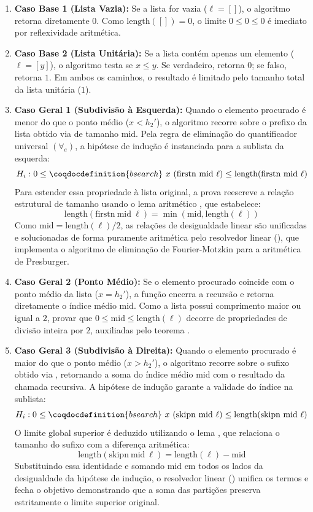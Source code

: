 \documentclass{article}
\begin{document}
\begin{enumerate}[leftmargin=*]
\item \textbf{Caso Base 1 (Lista Vazia):} Se a lista for vazia ($\ell = []$), o algoritmo retorna diretamente $0$. Como $\text{length}([]) = 0$, o limite $0 \le 0 \le 0$ é imediato por reflexividade aritmética.
\item \textbf{Caso Base 2 (Lista Unitária):} Se a lista contém apenas um elemento ($\ell = [y]$), o algoritmo testa se $x \le y$. Se verdadeiro, retorna $0$; se falso, retorna $1$. Em ambos os caminhos, o resultado é limitado pelo tamanho total da lista unitária ($1$).
\item \textbf{Caso Geral 1 (Subdivisão à Esquerda):} Quando o elemento procurado é menor do que o ponto médio ($x < h_2'$), o algoritmo recorre sobre o prefixo da lista obtido via  de tamanho $\text{mid}$. Pela regra de eliminação do quantificador universal $(\forall_e)$, a hipótese de indução é instanciada para a sublista da esquerda:
$$H_i: 0 \le \coqdocdefinition{bsearch} \ x \ (\text{firstn} \ \text{mid} \ \ell) \le \text{length}(\text{firstn} \ \text{mid} \ \ell)$$
Para estender essa propriedade à lista original, a prova reescreve a relação estrutural de tamanho usando o lema aritmético , que estabelece:
$$\text{length}(\text{firstn} \ \text{mid} \ \ell) = \min(\text{mid}, \text{length}(\ell))$$
Como $\text{mid} = \text{length}(\ell) / 2$, as relações de desigualdade linear são unificadas e solucionadas de forma puramente aritmética pelo resolvedor linear (), que implementa o algoritmo de eliminação de Fourier-Motzkin para a aritmética de Presburger.
\item \textbf{Caso Geral 2 (Ponto Médio):} Se o elemento procurado coincide com o ponto médio da lista ($x = h_2'$), a função encerra a recursão e retorna diretamente o índice médio $\text{mid}$. Como a lista possui comprimento maior ou igual a $2$, provar que $0 \le \text{mid} \le \text{length}(\ell)$ decorre de propriedades de divisão inteira por $2$, auxiliadas pelo teorema .
\item \textbf{Caso Geral 3 (Subdivisão à Direita):} Quando o elemento procurado é maior do que o ponto médio ($x > h_2'$), o algoritmo recorre sobre o sufixo obtido via , retornando a soma do índice médio $\text{mid}$ com o resultado da chamada recursiva. A hipótese de indução garante a validade do índice na sublista:
$$H_i: 0 \le \coqdocdefinition{bsearch} \ x \ (\text{skipn} \ \text{mid} \ \ell) \le \text{length}(\text{skipn} \ \text{mid} \ \ell)$$
O limite global superior é deduzido utilizando o lema , que relaciona o tamanho do sufixo com a diferença aritmética:
$$\text{length}(\text{skipn} \ \text{mid} \ \ell) = \text{length}(\ell) - \text{mid}$$
Substituindo essa identidade e somando $\text{mid}$ em todos os lados da desigualdade da hipótese de indução, o resolvedor linear () unifica os termos e fecha o objetivo demonstrando que a soma das partições preserva estritamente o limite superior original.
\end{enumerate}
\end{document}
